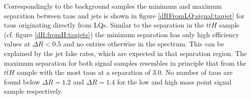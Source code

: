 %
Correspondingly to the background samples the minimum and maximum separation between taus and jets is shown in figure \ref{dRFromLQ:signal:taujet} for taus originating directly from LQs. Similar to the separation in the $t\bar{t}H$ sample (cf. figure \ref{dR:fromH:taujets}) the minimum separation has only high efficiency values at $\Delta R<0.5$ and no entries otherwise in the spectrum. This can be explained by the jet fake rates, which are expected in that separation region. The maximum separation for both signal samples resembles in principle that from the $t\bar{t}H$ sample with the most taus at a separation of $3.0$. No number of taus are found below $\Delta R=1.2$ and $\Delta R=1.4$ for the low and high mass point signal sample respectively. \newline
%
